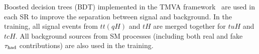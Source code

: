 
Boosted decision trees (BDT) implemented in the TMVA framework~\cite{Hocker:2007ht} are used in each SR to improve the separation between signal and background. 
In the training, all signal events from $tt(qH)$ and $tH$ are merged together for $tuH$ and $tcH$. All background sources from SM processes
(including both real and fake $\tau_{\mathrm{had}}$ contributions) are also used in the training.

